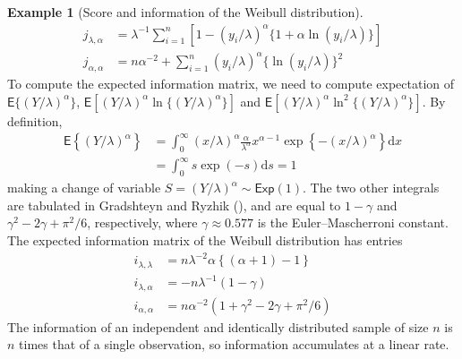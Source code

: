 \documentclass[
  11pt,
  letterpaper,
]{scrbook}
\theoremstyle{plain}
\theoremstyle{definition}
\newtheorem{example}{Example}[chapter]
\theoremstyle{definition}
\theoremstyle{plain}
\theoremstyle{remark}
\begin{document}
\begin{example}[Score and information of the Weibull
distribution]
\begin{align*}
j_{\lambda, \alpha} &= \lambda^{-1}\sum_{i=1}^n [1-(y_i/\lambda)^\alpha\{1+\alpha\ln(y_i/\lambda)\}] \\
j_{\alpha,\alpha} &= n\alpha^{-2} + \sum_{i=1}^n (y_i/\lambda)^\alpha \{\ln(y_i/\lambda)\}^2
\end{align*} To compute the expected information matrix, we need to
compute expectation of \(\mathsf{E}\{(Y/\lambda)^\alpha\}\),
\(\mathsf{E}[(Y/\lambda)^\alpha\ln\{(Y/\lambda)^\alpha\}]\) and
\(\mathsf{E}[(Y/\lambda)^\alpha\ln^2\{(Y/\lambda)^\alpha\}]\). By
definition, \begin{align*}
\mathsf{E}\left\{(Y/\lambda)^\alpha\right\} & = \int_0^\infty (x/\lambda)^\alpha \frac{\alpha}{\lambda^\alpha} x^{\alpha-1}\exp\left\{-(x/\lambda)^\alpha\right\} \mathrm{d} x \\
 &= \int_0^\infty s\exp(-s) \mathrm{d} s =1
\end{align*} making a change of variable
\(S = (Y/\lambda)^\alpha\sim \mathsf{Exp}(1)\). The two other integrals
are tabulated in Gradshteyn and Ryzhik
(), and are equal to
\(1-\gamma\) and \(\gamma^2-2\gamma + \pi^2/6\), respectively, where
\(\gamma \approx 0.577\) is the Euler--Mascherroni constant. The
expected information matrix of the Weibull distribution has entries
\begin{align*}
i_{\lambda, \lambda} & = n \lambda^{-2}\alpha\left\{ (\alpha+1)-1\right\} \\
i_{\lambda, \alpha} & = -n\lambda^{-1} (1-\gamma) \\
i_{\alpha, \alpha} & = n\alpha^{-2}(1 + \gamma^2-2\gamma+\pi^2/6) 
\end{align*} The information of an independent and identically
distributed sample of size \(n\) is \(n\) times that of a single
observation, so information accumulates at a linear rate.

\end{example}
\end{document}

